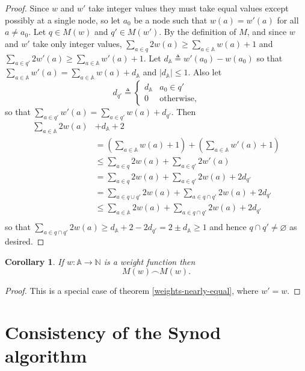 \documentclass[journal]{IEEEtran}
\newtheorem{corollary}[theorem]{Corollary}
\begin{document}
\begin{proof}Since $w$ and $w'$ take integer values they must take equal values
  except possibly at a single node, so let $a_0$ be a node such that $w(a) =
  w'(a)$ for all $a \ne a_0$.
%
Let $q \in M(w)$ and $q' \in M(w')$. By the definition of $M$, and since $w$
and $w'$ take only integer values,
%
$\sum_{a \in q} 2 w(a) \ge \sum_{a \in \mathbb A} w(a) + 1$
%
and
%
$\sum_{a \in q'} 2 w'(a) \ge \sum_{a \in \mathbb A} w'(a) + 1$.
%
Let $d_{\mathbb A} \triangleq w'(a_0) - w(a_0)$ so that $\sum_{a \in \mathbb A}
w'(a) = \sum_{a \in \mathbb A} w(a) + d_{\mathbb A}$ and $|d_\mathbb A| \le 1$.
Also let \[ d_{q'} \triangleq \begin{cases}
%
d_{\mathbb A} & a_0 \in q' \\
%
0 & \textrm{otherwise,}
%
\end{cases} \] so that $\sum_{a \in q'} w'(a) = \sum_{a \in q'} w(a) + d_{q'}$.
%
Then
%
\[\begin{split}
%
\sum_{a \in \mathbb A} 2w(a) &+ d_{\mathbb A} + 2 \\
%
&= \left( \sum_{a \in \mathbb A} w(a)  + 1\right) +  \left( \sum_{a \in \mathbb
A} w'(a) + 1\right) \\
%
&\le \sum_{a \in q}  2w(a) +    \sum_{a \in q'} 2w'(a) \\
%
&= \sum_{a \in q}  2w(a) +  \sum_{a \in q'} 2w(a) + 2d_{q'}\\
%
&= \sum_{a \in q \cup q'} 2w(a) +  \sum_{a \in q \cap q'} 2w(a) + 2d_{q'}\\
%
&\le \sum_{a \in \mathbb A} 2w(a) +    \sum_{a \in q \cap q'} 2w(a) + 2d_{q'}\\
%
\end{split}\] so that $\sum_{a \in q \cap q'} 2w(a) \ge d_{\mathbb A} + 2 -
2d_{q'} = 2 \pm d_\mathbb A \ge 1$ and hence $q \cap q' \ne \varnothing$ as
desired.  \end{proof}

\begin{corollary} \label{weights-equal} If $w : \mathbb A \to \mathbb N$ is a
weight function then \[M(w) \frown M(w).\]  \end{corollary}

\begin{proof} This is a special case of theorem \ref{weights-nearly-equal},
where $w' = w$.  \end{proof}


\section{Consistency of the Synod algorithm}
\label{synod-safety}
\end{document}
